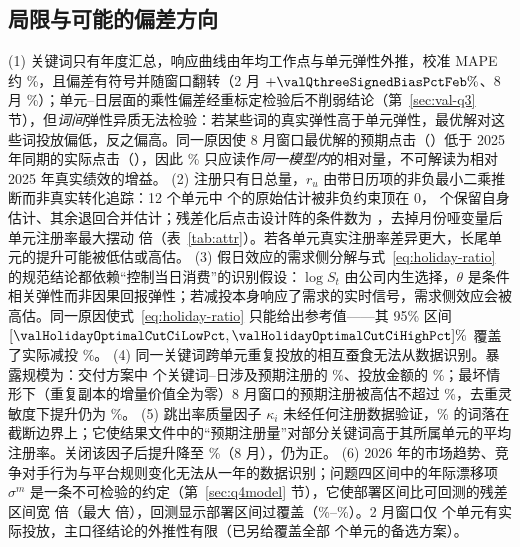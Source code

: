 \subsection{局限与可能的偏差方向}
\label{sec:limits}
(1) 关键词只有年度汇总，响应曲线由年均工作点与单元弹性外推，校准 MAPE 约 \valQthreeCalibrationMape\%，且偏差有符号并随窗口翻转（2 月 $+\valQthreeSignedBiasPctFeb\%$、8 月 \valQthreeSignedBiasPctAug\%）；单元--日层面的乘性偏差经重标定检验后不削弱结论（第~\ref{sec:val-q3} 节），但\emph{词间}弹性异质无法检验：若某些词的真实弹性高于单元弹性，最优解对这些词投放偏低，反之偏高。同一原因使 8 月窗口最优解的预期点击（\valQthreeOptClicksAug）低于 2025 年同期的实际点击（\valQthreeActualClicksAug），因此 \valQthreeRegGainPctAug\% 只应读作\emph{同一模型内}的相对量，不可解读为相对 2025 年真实绩效的增益。
(2) 注册只有日总量，$r_u$ 由带日历项的非负最小二乘推断而非真实转化追踪：12 个单元中 \valAttributionZeroBoundUnits{} 个的原始估计被非负约束顶在 0，\valUnitsWithOwnRate{} 个保留自身估计、其余退回合并估计；残差化后点击设计阵的条件数为 \valAttributionConditionNumber，去掉月份哑变量后单元注册率最大摆动 \valAttributionMaxSwingRatio{} 倍（表~\ref{tab:attr}）。若各单元真实注册率差异更大，长尾单元的提升可能被低估或高估。
(3) 假日效应的需求侧分解与式~\eqref{eq:holiday-ratio} 的规范结论都依赖“控制当日消费”的识别假设：$\log S_t$ 由公司内生选择，$\theta$ 是条件相关弹性而非因果回报弹性；若减投本身响应了需求的实时信号，需求侧效应会被高估。同一原因使式~\eqref{eq:holiday-ratio} 只能给出参考值——其 95\% 区间 $[\valHolidayOptimalCutCiLowPct,\valHolidayOptimalCutCiHighPct]\%$ 覆盖了实际减投 \valHolidayActualCutPct\%。
(4) 同一关键词跨单元重复投放的相互蚕食无法从数据识别。暴露规模为：交付方案中 \valQthreeDupKeywordDays{} 个关键词--日涉及预期注册的 \valQthreeDupRegsSharePct\%、投放金额的 \valQthreeDupSpendSharePct\%；最坏情形下（重复副本的增量价值全为零）8 月窗口的预期注册被高估不超过 \valQthreeDupRegsSharePct\%，去重灵敏度下提升仍为 \valQthreeDupBestGainPctAug\%。
(5) 跳出率质量因子 $\kappa_i$ 未经任何注册数据验证，\valKappaAtBoundPct\% 的词落在截断边界上；它使结果文件中的“预期注册量”对部分关键词高于其所属单元的平均注册率。关闭该因子后提升降至 \valQthreeKappaOneGainPctAug\%（8 月），仍为正。
(6) 2026 年的市场趋势、竞争对手行为与平台规则变化无法从一年的数据识别；问题四区间中的年际漂移项 $\sigma^{m}$ 是一条不可检验的约定（第~\ref{sec:q4model} 节），它使部署区间比可回测的残差区间宽 \valQfourWidthInflationMedian{} 倍（最大 \valQfourWidthInflationMax{} 倍），回测显示部署区间过覆盖（\valBacktestWideCoverageMin\%--\valBacktestWideCoverageMax\%）。2 月窗口仅 \valQthreeUnitsFeb{} 个单元有实际投放，主口径结论的外推性有限（已另给覆盖全部 \valQthreeFebAltUnits{} 个单元的备选方案）。
